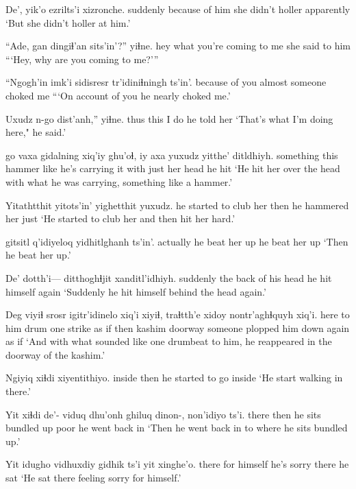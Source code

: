 \documentclass[12pt]{article}
\begin{document}
\gll De', yik'o          {ezrilts'i}        xizronche.
suddenly   {because of him} {she didn't holler} apparently
\glt `But she didn't holler at him.'
\glend

\gll ``Ade, gan {dingiɬ'an    sits'in'?''} yiɬne.
hey    what {you're coming to me} {she said to him}
\glt ```Hey, why are you coming to me?'''
\glend

\gll ``Ngogh'in      imk'i  {sidisresr tr'idiniɬningh} ts'in'.
{because of you} almost {someone choked me}
\glt ```On account of you he nearly choked me.'
\glend

\gll Uxudz n-go dist'anh,'' yiɬne.
thus  this {I do}    {he told her}
\glt `That's what I'm doing here," he said.'
\glend

 go   {vaxa gidalning} xiq'iy ghu'oɬ,    iy axa  yuxudz yitthe'  ditldhiyh.
something   this hammer           like   {he's carrying} it with just {her head} {he hit}
\glt `He hit her over the head with what he was carrying, something like a hammer.'
\glend

\gll Yitathtthit            yitots'in' yighetthit      yuxudz.
{he started to club her} then      {he hammered her} just
\glt `He started to club her and then hit her hard.'
\glend
 
 {gitsitl q'idiyeloq} yidhitlghanh   ts'in'.
actually         {he beat her up}     {he beat her up}
\glt `Then he beat her up.'
\glend

\gll De' dotth'i--- ditthoghɬjit xanditl'idhiyh.
suddenly {} {the back of his head} {he hit himself again}
\glt `Suddenly he hit himself behind the head again.'
\glend

\gll Deg viyiɬ  srosr igitr'idinelo xiq'i xiyiɬ, traɬtth'e xidoy   nontr'aghɬquyh xiq'i.
here {to him} drum  {one strike} {as if} then kashim  doorway {someone plopped him down again} {as if}
\glt `And with what sounded like one drumbeat to him, he reappeared in the doorway of the kashim.'
\glend

\gll Ngiyiq xiɬdi xiyentithiyo.
inside  then {he started to go inside}
\glt `He start walking in there.'
\glend

\gll Yit   xiɬdi de'- {viduq dhu'onh}          ghiluq dinon-, non'idiyo ts'i.
there then  {}   {he sits bundled up} poor {}      {he went back in}
\glt `Then he went back in to where he sits bundled up.'
\glend

\gll Yit   idugho      {vidhuxdiy gidhik} ts'i yit xinghe'o.
there {for himself} {he's sorry}     {}  there  {he sat}
\glt `He sat there feeling sorry for himself.'
\glend
\end{document}
